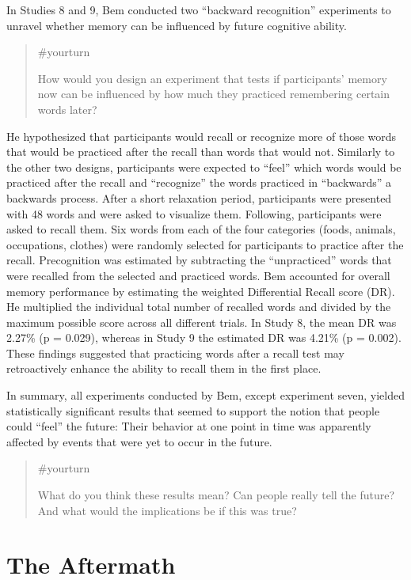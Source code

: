 \documentclass[
  letterpaper,
]{book}
\begin{document}
In Studies 8 and 9, Bem conducted two ``backward recognition''
experiments to unravel whether memory can be influenced by future
cognitive ability.

\begin{quote}
{\#yourturn}

How would you design an experiment that tests if participants' memory
now can be influenced by how much they practiced remembering certain
words later?
\end{quote}

He hypothesized that participants would recall or recognize more of
those words that would be practiced after the recall than words that
would not. Similarly to the other two designs, participants were
expected to ``feel'' which words would be practiced after the recall and
``recognize'' the words practiced in ``backwards'' a backwards process.
After a short relaxation period, participants were presented with 48
words and were asked to visualize them. Following, participants were
asked to recall them. Six words from each of the four categories (foods,
animals, occupations, clothes) were randomly selected for participants
to practice after the recall. Precognition was estimated by subtracting
the ``unpracticed'' words that were recalled from the selected and
practiced words. Bem accounted for overall memory performance by
estimating the weighted Differential Recall score (DR). He multiplied
the individual total number of recalled words and divided by the maximum
possible score across all different trials. In Study 8, the mean DR was
2.27\% (p = 0.029), whereas in Study 9 the estimated DR was 4.21\% (p =
0.002). These findings suggested that practicing words after a recall
test may retroactively enhance the ability to recall them in the first
place.

In summary, all experiments conducted by Bem, except experiment seven,
yielded statistically significant results that seemed to support the
notion that people could ``feel'' the future: Their behavior at one
point in time was apparently affected by events that were yet to occur
in the future.

\begin{quote}
{\#yourturn}

What do you think these results mean? Can people really tell the future?
And what would the implications be if this was true?
\end{quote}

\section{The Aftermath}\label{the-aftermath-5}
\end{document}
